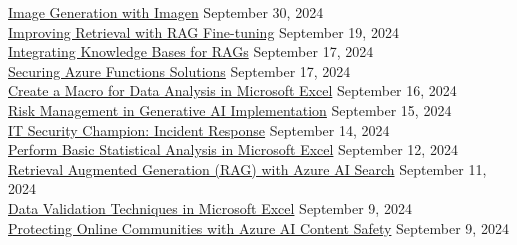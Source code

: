 \documentclass[10pt]{res} %
\begin{document}
\begin{resume}
\href{https://bjdelacruz.dev/files/certificates/pluralsight/Image_Generation_with_Imagen.pdf}{\color{blue}Image Generation with Imagen} \hfill September 30, 2024 \\
\href{https://bjdelacruz.dev/files/certificates/pluralsight/Improving_Retrieval_with_RAG_Fine-tuning.pdf}{\color{blue}Improving Retrieval with RAG Fine-tuning} \hfill September 19, 2024 \\
\href{https://bjdelacruz.dev/files/certificates/pluralsight/Integrating_Knowledge_Bases_for_RAGs.pdf}{\color{blue}Integrating Knowledge Bases for RAGs} \hfill September 17, 2024 \\
\href{https://bjdelacruz.dev/files/certificates/pluralsight/Securing_Azure_Functions_Solutions.pdf}{\color{blue}Securing Azure Functions Solutions} \hfill September 17, 2024 \\
\href{https://bjdelacruz.dev/files/certificates/pluralsight/Create_a_Macro_for_Data_Analysis_in_Microsoft_Excel.pdf}{\color{blue}Create a Macro for Data Analysis in Microsoft Excel} \hfill September 16, 2024 \\
\href{https://bjdelacruz.dev/files/certificates/pluralsight/Risk_Management_in_Generative_AI_Implementation.pdf}{\color{blue}Risk Management in Generative AI Implementation} \hfill September 15, 2024 \\
\href{https://bjdelacruz.dev/files/certificates/pluralsight/IT_Security_Champion_-_Incident_Response.pdf}{\color{blue}IT Security Champion: Incident Response} \hfill September 14, 2024 \\
\href{https://bjdelacruz.dev/files/certificates/pluralsight/Perform_Basic_Statistical_Analysis_in_Microsoft_Excel.pdf}{\color{blue}Perform Basic Statistical Analysis in Microsoft Excel} \hfill September 12, 2024 \\
\href{https://bjdelacruz.dev/files/certificates/pluralsight/Retrieval_Augmented_Generation_(RAG)_with_Azure_AI_Search.pdf}{\color{blue}Retrieval Augmented Generation (RAG) with Azure AI Search} \hfill September 11, 2024 \\
\href{https://bjdelacruz.dev/files/certificates/pluralsight/Data_Validation_Techniques_in_Microsoft_Excel.pdf}{\color{blue}Data Validation Techniques in Microsoft Excel} \hfill September 9, 2024 \\
\href{https://bjdelacruz.dev/files/certificates/pluralsight/Protecting_Online_Communities_with_Azure_AI_Content_Safety.pdf}{\color{blue}Protecting Online Communities with Azure AI Content Safety} \hfill September 9, 2024 \\

\end{resume}
\end{document}
